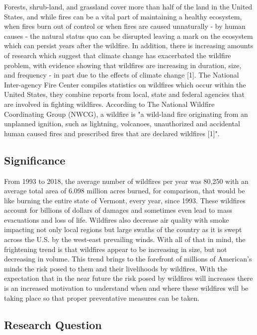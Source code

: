\documentclass[12pt]{article}
\begin{document}
Forests, shrub-land, and grassland cover more than half of the land in the United States, and while fires can be a vital part of maintaining a healthy ecosystem, when fires burn out of control or when fires are caused unnaturally - by human causes -  the natural status quo can be disrupted leaving a mark on the ecosystem which can persist years after the wildfire. In addition, there is increasing amounts of research which suggest that climate change has exacerbated the wildfire problem, with evidence showing that wildfires are increasing in duration, size, and frequency - in part due to the effects of climate change [1]. The National Inter-agency Fire Center compiles statistics on wildfires which occur within the United States, they combine reports from local, state and federal agencies that are involved in fighting wildfires. According to The National Wildfire Coordinating Group (NWCG), a wildfire is "a wild-land fire originating from an unplanned ignition, such as lightning, volcanoes, unauthorized and accidental human caused fires and prescribed fires that are declared wildfires [1]". 

\subsection{\textrm{Significance}} 

From 1993 to 2018, the average number of wildfires per year was 80,250 with an average total area of 6.098 million acres burned, for comparison, that would be like burning the entire state of Vermont, every year, since 1993. These wildfires account for billions of dollars of damages and sometimes even lead to mass evacuations and loss of life. Wildfires also decrease air quality with smoke impacting not only local regions but large swaths of the country as it is swept across the U.S. by the west-east prevailing winds. With all of that in mind, the frightening trend is that wildfires appear to be increasing in size, but not decreasing in volume. This trend brings to the forefront of millions of American's minds the risk posed to them and their livelihoods by wildfires. With the expectation that in the near future the risk posed by wildfires will increases there is an increased motivation to understand when and where these wildfires will be taking place so that proper preventative measures can be taken. \\

\subsection{\textrm{Research Question}}
\end{document}

